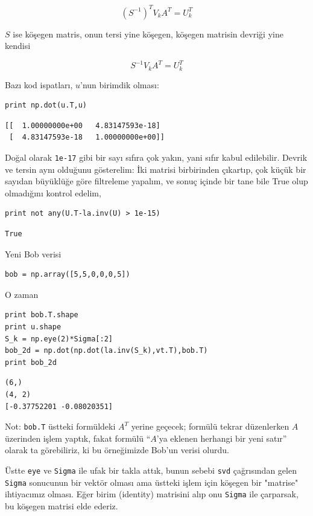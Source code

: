 \documentclass[12pt,fleqn]{article}\usepackage{../../common}
\begin{document}
$$ (S^{-1})^T V_k A^T = U_k^T $$

$S$ ise köşegen matris, onun tersi yine köşegen, köşegen matrisin devriği
yine kendisi

$$ S^{-1} V_k A^T = U_k^T $$

Bazı kod ispatları, $u$'nun birimdik olması:

\begin{verbatim}
print np.dot(u.T,u)
\end{verbatim}

\begin{verbatim}
[[  1.00000000e+00   4.83147593e-18]
 [  4.83147593e-18   1.00000000e+00]]
\end{verbatim}

Doğal olarak \verb!1e-17! gibi bir sayı sıfıra çok yakın, yani sıfır kabul
edilebilir. Devrik ve tersin aynı olduğunu gösterelim: İki matrisi birbirinden
çıkartıp, çok küçük bir sayıdan büyüklüğe göre filtreleme yapalım, ve sonuç
içinde bir tane bile True olup olmadığını kontrol edelim,

\begin{verbatim}
print not any(U.T-la.inv(U) > 1e-15)
\end{verbatim}

\begin{verbatim}
True
\end{verbatim}

Yeni Bob verisi 

\begin{verbatim}
bob = np.array([5,5,0,0,0,5]) 
\end{verbatim}

O zaman 

\begin{verbatim}
print bob.T.shape
print u.shape
S_k = np.eye(2)*Sigma[:2]
bob_2d = np.dot(np.dot(la.inv(S_k),vt.T),bob.T)
print bob_2d
\end{verbatim}

\begin{verbatim}
(6,)
(4, 2)
[-0.37752201 -0.08020351]
\end{verbatim}

Not: \verb!bob.T! üstteki formüldeki $A^T$ yerine geçecek; formülü tekrar
düzenlerken $A$ üzerinden işlem yaptık, fakat formülü ``$A$'ya eklenen
herhangi bir yeni satır'' olarak ta görebiliriz, ki bu örneğimizde Bob'un
verisi olurdu. 

Üstte \verb!eye! ve \verb!Sigma! ile ufak bir takla attık, bunun sebebi
\verb!svd! çağrısından gelen \verb!Sigma!  sonucunun bir vektör olması ama
üstteki işlem için köşegen bir "matrise" ihtiyacımız olması. Eğer birim
(identity) matrisini alıp onu \verb!Sigma! ile çarparsak, bu köşegen
matrisi elde ederiz.
\end{document}
